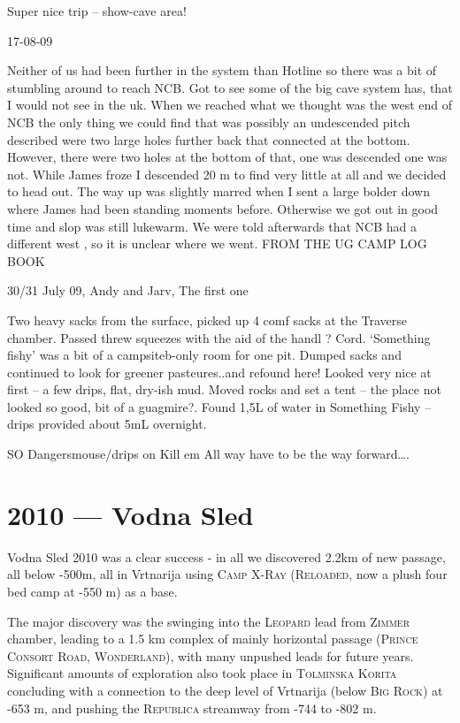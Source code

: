 Super nice trip -- show-cave area!

17-08-09

Neither of us had been further in the system than Hotline so there was a
bit of stumbling around to reach NCB. Got to see some of the big cave
system has, that I would not see in the uk. When we reached what we
thought was the west end of NCB the only thing we could find that was
possibly an undescended pitch described were two large holes further
back that connected at the bottom. However, there were two holes at the
bottom of that, one was descended one was not. While James froze I
descended 20 m to find very little at all and we decided to head out.
The way up was slightly marred when I sent a large bolder down where
James had been standing moments before. Otherwise we got out in good
time and slop was still lukewarm. We were told afterwards that NCB had a
different west , so it is unclear where we went. FROM THE UG CAMP LOG
BOOK

30/31 July 09, Andy and Jarv, The first one

Two heavy sacks from the surface, picked up 4 comf sacks at the Traverse
chamber. Passed threw squeezes with the aid of the handl ? Cord.
`Something fishy' was a bit of a campsiteb-only room for one pit. Dumped
sacks and continued to look for greener pasteures..and refound here!
Looked very nice at first -- a few drips, flat, dry-ish mud. Moved rocks
and set a tent -- the place not looked so good, bit of a guagmire?.
Found 1,5L of water in Something Fishy -- drips provided about 5mL
overnight.

SO Dangersmouse/drips on Kill em All way have to be the way
forward\ldots{}.

\chapter{2010 --- Vodna Sled}\label{vodna-sled}

Vodna Sled 2010 was a clear success - in all we discovered 2.2km of new
passage, all below -500m, all in Vrtnarija using \textsc{Camp
X-Ray} (\textsc{Reloaded}, now a plush four bed camp at -550 m) as a
base.

The major discovery was the swinging into the \textsc{Leopard} lead from
\textsc{Zimmer} chamber, leading to a 1.5 km complex of mainly
horizontal passage (\textsc{Prince Consort Road}, \textsc{Wonderland}),
with many unpushed leads for future years. Significant amounts of
exploration also took place in \textsc{Tolminska Korita} concluding with
a connection to the deep level of Vrtnarija (below \textsc{Big Rock}) at
-653 m, and pushing the \textsc{Republica} streamway from -744 to -802
m.

